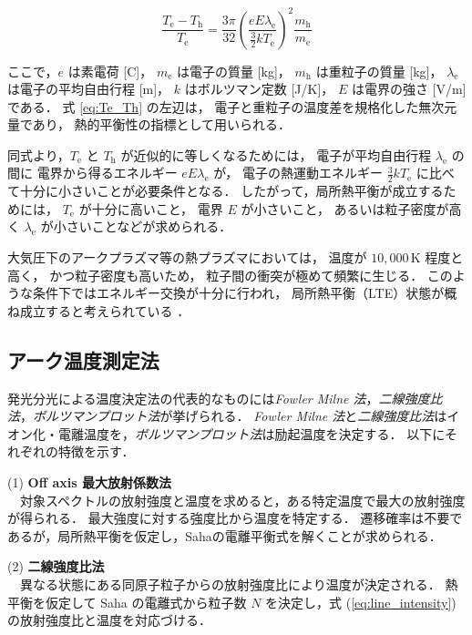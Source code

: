 \documentclass[dvipdfmx,report,uplatex]{jsbook}
\numberwithin{equation}{section}
\numberwithin{figure}{section}
\numberwithin{table}{section}
\begin{document}
\begin{equation}
\frac{T_{\mathrm{e}} - T_{\mathrm{h}}}{T_{\mathrm{e}}}
=
\frac{3 \pi}{32}
\left(
\frac{e E \lambda_{\mathrm{e}}}{\frac{3}{2} k T_{\mathrm{e}}}
\right)^2
\frac{m_{\mathrm{h}}}{m_{\mathrm{e}}}
\label{eq:Te_Th}
\end{equation}

ここで，$e$ は素電荷 [C]，
$m_{\mathrm{e}}$ は電子の質量 [kg]，
$m_{\mathrm{h}}$ は重粒子の質量 [kg]，
$\lambda_{\mathrm{e}}$ は電子の平均自由行程 [m]，
$k$ はボルツマン定数 [J/K]，
$E$ は電界の強さ [V/m] である．
式 \eqref{eq:Te_Th} の左辺は，
電子と重粒子の温度差を規格化した無次元量であり，
熱的平衡性の指標として用いられる．

同式より，$T_{\mathrm{e}}$ と $T_{\mathrm{h}}$ が近似的に等しくなるためには，
電子が平均自由行程 $\lambda_{\mathrm{e}}$ の間に
電界から得るエネルギー $e E \lambda_{\mathrm{e}}$ が，
電子の熱運動エネルギー $\frac{3}{2} k T_{\mathrm{e}}$
に比べて十分に小さいことが必要条件となる．
したがって，局所熱平衡が成立するためには，
$T_{\mathrm{e}}$ が十分に高いこと，
電界 $E$ が小さいこと，
あるいは粒子密度が高く
$\lambda_{\mathrm{e}}$ が小さいことなどが求められる．

大気圧下のアークプラズマ等の熱プラズマにおいては，
温度が $10{,}000\,\mathrm{K}$ 程度と高く，
かつ粒子密度も高いため，
粒子間の衝突が極めて頻繁に生じる．
このような条件下ではエネルギー交換が十分に行われ，
局所熱平衡（LTE）状態が概ね成立すると考えられている
\cite{1520853832517707008}．


\subsection{アーク温度測定法}
発光分光による温度決定法の代表的なものには\textit{Fowler Milne 法}，\textit{二線強度比法}，\textit{ボルツマンプロット法}が挙げられる．  
\textit{Fowler Milne 法}と\textit{二線強度比法}はイオン化・電離温度を，\textit{ボルツマンプロット法}は励起温度を決定する\cite{平岡和雄1998アークプラズマの分光計測}．
以下にそれぞれの特徴を示す．

(1) \textbf{Off axis 最大放射係数法} \\
　対象スペクトルの放射強度と温度を求めると，ある特定温度で最大の放射強度が得られる．  
最大強度に対する強度比から温度を特定する．  
遷移確率は不要であるが，局所熱平衡を仮定し，Sahaの電離平衡式を解くことが求められる．

(2) \textbf{二線強度比法}  \\
　異なる状態にある同原子粒子からの放射強度比により温度が決定される．  
熱平衡を仮定して Saha の電離式から粒子数 \(N\) を決定し，式 (\ref{eq:line_intensity}) の放射強度比と温度を対応づける．
\end{document}
